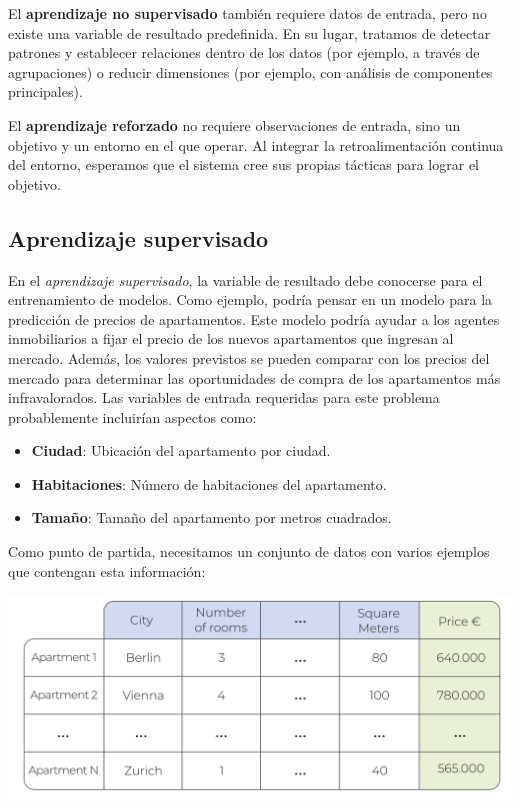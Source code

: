 \documentclass[
]{book}
\providecommand{\tightlist}{%
  \setlength{\itemsep}{0pt}\setlength{\parskip}{0pt}}
\begin{document}
El \textbf{aprendizaje no supervisado} también requiere datos de entrada, pero no existe una variable de resultado predefinida. En su lugar, tratamos de detectar patrones y establecer relaciones dentro de los datos (por ejemplo, a través de agrupaciones) o reducir dimensiones (por ejemplo, con análisis de componentes principales).

El \textbf{aprendizaje reforzado} no requiere observaciones de entrada, sino un objetivo y un entorno en el que operar. Al integrar la retroalimentación continua del entorno, esperamos que el sistema cree sus propias tácticas para lograr el objetivo.

\hypertarget{aprendizaje-supervisado}{%
\subsection{Aprendizaje supervisado}\label{aprendizaje-supervisado}}

En el \emph{aprendizaje supervisado}, la variable de resultado debe conocerse para el entrenamiento de modelos. Como ejemplo, podría pensar en un modelo para la predicción de precios de apartamentos. Este modelo podría ayudar a los agentes inmobiliarios a fijar el precio de los nuevos apartamentos que ingresan al mercado. Además, los valores previstos se pueden comparar con los precios del mercado para determinar las oportunidades de compra de los apartamentos más infravalorados. Las variables de entrada requeridas para este problema probablemente incluirían aspectos como:

\begin{itemize}
\tightlist
\item
  \textbf{Ciudad}: Ubicación del apartamento por ciudad.
\item
  \textbf{Habitaciones}: Número de habitaciones del apartamento.
\item
  \textbf{Tamaño}: Tamaño del apartamento por metros cuadrados.
\end{itemize}

Como punto de partida, necesitamos un conjunto de datos con varios ejemplos que contengan esta información:

\includegraphics{img/tab1.png}
\end{document}
